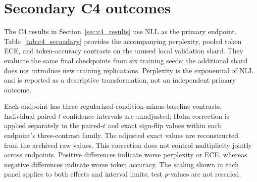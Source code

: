 \documentclass[10pt,a4paper,twocolumn]{article}
\begin{document}
\section{Secondary C4 outcomes}
\label{app:c4_secondary}

The C4 results in Section~\ref{sec:c4_results} use NLL as the primary
endpoint. Table~\ref{tab:c4_secondary} provides the accompanying
perplexity, pooled token ECE, and token-accuracy contrasts on the unused
local validation shard. They evaluate the same final checkpoints from
six training seeds; the additional shard does not introduce new training
replications. Perplexity is the exponential of NLL and is reported as
a descriptive transformation, not an independent primary outcome.

Each endpoint has three regularized-condition-minus-baseline contrasts.
Individual paired-$t$ confidence intervals are unadjusted; Holm
correction is applied separately to the paired-$t$ and exact sign-flip
values within each endpoint's three-contrast family. The adjusted exact
values are reconstructed from the archived raw values. This correction
does not control multiplicity jointly across endpoints. Positive
differences indicate worse perplexity or ECE, whereas negative
differences indicate worse token accuracy. The scaling shown in each
panel applies to both effects and interval limits; test $p$-values are
not rescaled.
\end{document}
